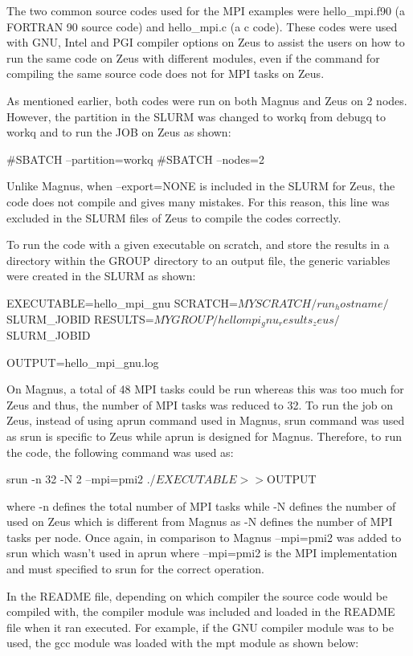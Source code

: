 \documentclass[journal]{IEEEtran}
\begin{document}
The two common source codes used for the MPI examples were hello_mpi.f90 (a FORTRAN 90 source code) and hello_mpi.c (a c code). These codes were used 
with GNU, Intel and PGI compiler options on Zeus to assist the users on how to run the same code on Zeus with different modules, even if the command 
for compiling the same source code does not for MPI tasks on Zeus.

As mentioned earlier, both codes were run on both Magnus and Zeus on 2 nodes. However, the partition in the SLURM was changed to workq from debugq to 
workq and to run the JOB on Zeus as shown:

#SBATCH --partition=workq
#SBATCH --nodes=2

Unlike Magnus, when --export=NONE is included in the SLURM for Zeus, the code does not compile and gives many mistakes. For this reason, this line was
excluded in the SLURM files of Zeus to compile the codes correctly.

To run the code with a given executable on scratch, and store the results in a directory within the GROUP directory to an output file, the generic 
variables were created in the SLURM as shown:

EXECUTABLE=hello_mpi_gnu
SCRATCH=$MYSCRATCH/run_hostname/$SLURM_JOBID
RESULTS=$MYGROUP/hellompi_gnu_results_zeus/$SLURM_JOBID

OUTPUT=hello_mpi_gnu.log

On Magnus, a total of 48 MPI tasks could be run whereas this was too much for Zeus and thus, the number of MPI tasks was reduced to 32. To run the job
on Zeus, instead of using aprun command used in Magnus, srun command was used as srun is specific to Zeus while aprun is designed for Magnus. Therefore,
to run the code, the following command was used as:

srun -n 32 -N 2 --mpi=pmi2 ./$EXECUTABLE >> ${OUTPUT}

where -n defines the total number of MPI tasks while -N defines the number of used on Zeus which is different from Magnus as -N defines the number of
MPI tasks per node. Once again, in comparison to Magnus --mpi=pmi2 was added to srun which wasn't used in aprun where --mpi=pmi2 is the MPI
implementation and must specified to srun for the correct operation.

In the README file, depending on which compiler the source code would be compiled with, the compiler module was included and loaded in the README file 
when it ran executed. For example, if the GNU compiler module was to be used, the gcc module was loaded with the mpt module as shown below:
\end{document}
